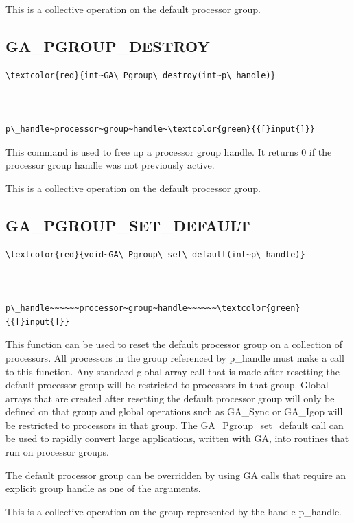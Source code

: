 This is a collective operation on the default processor group. 


\subsection*{\label{sub:GA_PGROUP_DESTROY}GA\_PGROUP\_DESTROY}
\begin{verbatim}
\textcolor{red}{int~GA\_Pgroup\_destroy(int~p\_handle)}



p\_handle~processor~group~handle~\textcolor{green}{{[}input{]}}
\end{verbatim}
This command is used to free up a processor group handle. It returns
0 if the processor group handle was not previously active.

This is a collective operation on the default processor group. 


\subsection*{\label{sub:GA_PGROUP_SET_DEFAULT}GA\_PGROUP\_SET\_DEFAULT}
\begin{verbatim}
\textcolor{red}{void~GA\_Pgroup\_set\_default(int~p\_handle)}



p\_handle~~~~~~processor~group~handle~~~~~~\textcolor{green}{{[}input{]}}
\end{verbatim}
This function can be used to reset the default processor group on
a collection of processors. All processors in the group referenced
by p\_handle must make a call to this function. Any standard global
array call that is made after resetting the default processor group
will be restricted to processors in that group. Global arrays that
are created after resetting the default processor group will only
be defined on that group and global operations such as GA\_Sync or
GA\_Igop will be restricted to processors in that group. The GA\_Pgroup\_set\_default
call can be used to rapidly convert large applications, written with
GA, into routines that run on processor groups.

The default processor group can be overridden by using GA calls that
require an explicit group handle as one of the arguments.

This is a collective operation on the group represented by the handle
p\_handle. 



